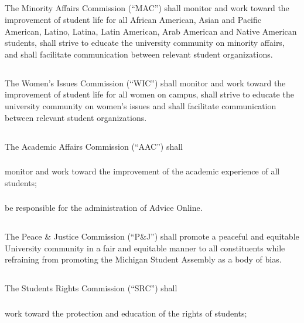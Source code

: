 \subsection{}
The Minority Affairs Commission (``MAC'') shall monitor and work toward the improvement of student life for all African American, Asian and Pacific American, Latino, Latina, Latin American, Arab American and Native American students, shall strive to educate the university community on minority affairs, and shall facilitate communication between relevant student organizations.

\subsection{}
The Women's Issues Commission (``WIC'') shall monitor and work toward the improvement of student life for all women on campus, shall strive to educate the university community on women's issues and shall facilitate communication between relevant student organizations.

\subsection{}
The Academic Affairs Commission (``AAC'') shall 
\subsubsection{}
monitor and work toward the improvement of the academic experience of all students;
\subsubsection{}
be responsible for the administration of Advice Online.


\subsection{}
The Peace \& Justice Commission (``P\&J'') shall promote a peaceful and equitable University community in a fair and equitable manner to all constituents while refraining from promoting the Michigan Student Assembly as a body of bias.

\subsection{}
The Students Rights Commission (``SRC'') shall
\subsubsection{}
work toward the protection and education of the rights of students;
